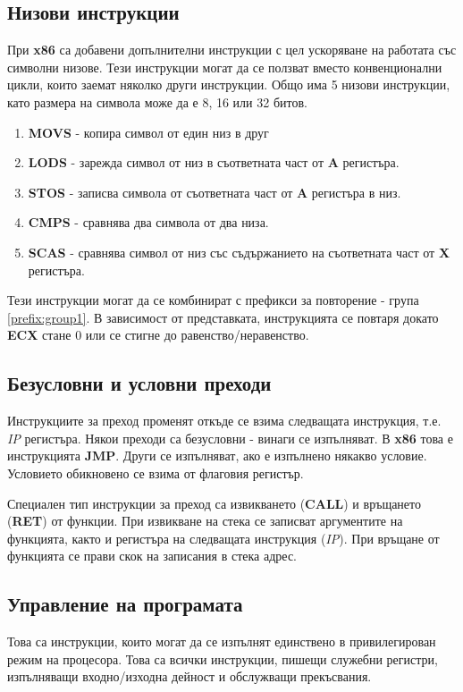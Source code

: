 \documentclass[fleqn,12pt]{article}
\begin{document}
\subsection{Низови инструкции}
При \textbf{x86} са добавени допълнителни инструкции с цел ускоряване на работата със символни низове.
Тези инструкции могат да се ползват вместо конвенционални цикли, които заемат няколко други инструкции.
Общо има 5 низови инструкции, като размера на символа може да е 8, 16 или 32 битов.
\begin{enumerate}
    \item \textbf{MOVS} - копира символ от един низ в друг
    \item \textbf{LODS} - зарежда символ от низ в съответната част от \textbf{A} регистъра.
    \item \textbf{STOS} - записва символа от съответната част от \textbf{A} регистъра в низ.
    \item \textbf{CMPS} - сравнява два символа от два низа.
    \item \textbf{SCAS} - сравнява символ от низ със съдържанието на съответната част от \textbf{X} регистъра.
\end{enumerate}

Тези инструкции могат да се комбинират с префикси за повторение - група \ref{prefix:group1}. 
В зависимост от представката, инструкцията се повтаря докато \textbf{ECX} стане 0 или се стигне
до равенство/неравенство.

\subsection{Безусловни и условни преходи}
Инструкциите за преход променят откъде се взима следващата инструкция, т.е. \textit{IP} регистъра.
Някои преходи са безусловни - винаги се изпълняват. В \textbf{x86} това е инструкцията \textbf{JMP}.
Други се изпълняват, ако е изпълнено някакво условие. Условието обикновено се взима от флаговия регистър.

Специален тип инструкции за преход са извикването (\textbf{CALL}) и връщането (\textbf{RET}) от функции.
При извикване на стека се записват аргументите на функцията, както и регистъра на следващата инструкция (\textit{IP}).
При връщане от функцията се прави скок на записания в стека адрес.

\subsection{Управление на програмата}
Това са инструкции, които могат да се изпълнят единствено в привилегирован режим на процесора.
Това са всички инструкции, пишещи служебни регистри, изпълняващи входно/изходна дейност и 
обслужващи прекъсвания.
\end{document}
